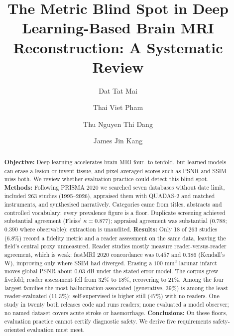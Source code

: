 \documentclass[review,authoryear]{elsarticle}
\begin{document}
\linenumbers

\begin{frontmatter}

\title{The Metric Blind Spot in Deep Learning-Based Brain MRI Reconstruction: A Systematic Review}

\author[rmitvn]{Dat Tat Mai}
\author[rmitct]{Thai Viet Pham}
\author[rmithb]{Thu Nguyen Thi Dang}
\author[rmitvn]{James Jin Kang}



\begin{abstract}
\textbf{Objective:} Deep learning accelerates brain MRI four- to tenfold, but learned models can erase a lesion or invent tissue, and pixel-averaged scores such as PSNR and SSIM miss both. We review whether evaluation practice could detect this blind spot. \textbf{Methods:} Following PRISMA 2020 we searched seven databases without date limit, included 263 studies (1995--2026), appraised them with QUADAS-2 and matched instruments, and synthesised narratively. Categories came from titles, abstracts and controlled vocabulary; every prevalence figure is a floor. Duplicate screening achieved substantial agreement (Fleiss' $\kappa=0.877$); appraisal agreement was substantial ($0.788$; $0.390$ where observable); extraction is unaudited. \textbf{Results:} Only 18 of 263 studies (6.8\%) record a fidelity metric and a reader assessment on the same data, leaving the field's central proxy unmeasured. Reader studies mostly measure reader-versus-reader agreement, which is weak: fastMRI 2020 concordance was $0.457$ and $0.386$ (Kendall's W), improving only where SSIM had diverged. Erasing a $100\text{ mm}^3$ lacunar infarct moves global PSNR about $0.03$ dB under the stated error model. The corpus grew fivefold; reader assessment fell from 32\% to 18\%, recovering to 21\%. Among the four largest families the most hallucination-associated (generative, 39\%) is among the least reader-evaluated (11.3\%); self-supervised is higher still (47\%) with no readers. One study in twenty both releases code and runs readers; none evaluated a model observer; no named dataset covers acute stroke or haemorrhage. \textbf{Conclusions:} On these floors, evaluation practice cannot certify diagnostic safety. We derive five requirements safety-oriented evaluation must meet.
\end{abstract}


\end{frontmatter}
\end{document}
